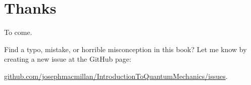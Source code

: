 \documentclass[10pt, a5paper, twoside, openany]{memoir}
\newcounter{example}[chapter]
\begin{document}
\section{Thanks}

To come.

\vspace{1in}

Find a typo, mistake, or horrible misconception in this book?  Let me know by creating a new issue at the GitHub page:  

\href{https://github.com/josephmacmillan/IntroductionToQuatumMechanics/issues}{github.com/josephmacmillan/IntroductionToQuantumMechanics/issues}.



\mainmatter





\end{document}
